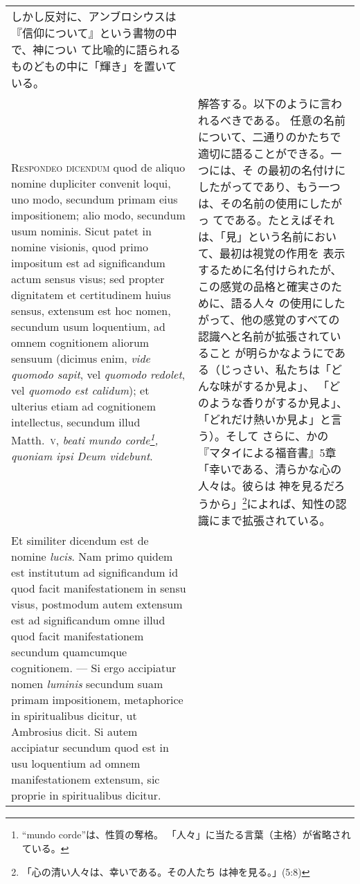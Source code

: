 \documentclass[10pt]{jsarticle} %
\begin{document}
\begin{longtable}{p{21em}p{21em}}
しかし反対に、アンブロシウスは『信仰について』という書物の中で、神につい
 て比喩的に語られるものどもの中に「輝き」を置いている。

\\


{\scshape Respondeo dicendum} quod de aliquo nomine dupliciter convenit
loqui, uno modo, secundum primam eius impositionem; alio modo, secundum
usum nominis. Sicut patet in nomine visionis, quod primo impositum est
ad significandum actum sensus visus; sed propter dignitatem et
certitudinem huius sensus, extensum est hoc nomen, secundum usum
loquentium, ad omnem cognitionem aliorum sensuum (dicimus enim, {\itshape vide
quomodo sapit}, vel {\itshape quomodo redolet}, vel {\itshape quomodo est calidum}); et
ulterius etiam ad cognitionem intellectus, secundum illud Matth.~{\scshape v},
{\itshape beati mundo corde\footnote{ ``mundo corde''は、性質の奪格。
 「人々」に当たる言葉（主格）が省略されている。 }, quoniam ipsi Deum videbunt}. 


&


解答する。以下のように言われるべきである。
任意の名前について、二通りのかたちで適切に語ることができる。一つには、そ
 の最初の名付けにしたがってであり、もう一つは、その名前の使用にしたがっ
 てである。たとえばそれは、「見」という名前において、最初は視覚の作用を
 表示するために名付けられたが、この感覚の品格と確実さのために、語る人々
 の使用にしたがって、他の感覚のすべての認識へと名前が拡張されていること
 が明らかなようにである（じっさい、私たちは「どんな味がするか見よ」、
 「どのような香りがするか見よ」、「どれだけ熱いか見よ」と言う）。そして
 さらに、かの『マタイによる福音書』5章「幸いである、清らかな心の人々は。彼らは
 神を見るだろうから」\footnote{「心の清い人々は、幸いである。その人たち
 は神を見る。」(5:8)}によれば、知性の認識にまで拡張されている。



\\


Et similiter dicendum est de nomine {\itshape lucis}. Nam primo quidem
est institutum ad significandum id quod facit manifestationem in sensu
visus, postmodum autem extensum est ad significandum omne illud quod
facit manifestationem secundum quamcumque cognitionem. --- Si ergo
accipiatur nomen {\itshape luminis} secundum suam primam impositionem,
metaphorice in spiritualibus dicitur, ut Ambrosius dicit. Si autem
accipiatur secundum quod est in usu loquentium ad omnem manifestationem
extensum, sic proprie in spiritualibus dicitur.

&



\end{longtable}
\end{document}
